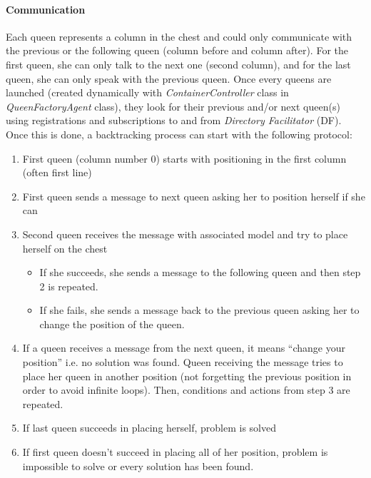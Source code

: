 \documentclass[a4paper,11pt]{article}
\begin{document}
  \paragraph{Communication}  
  Each queen represents a column in the chest and could only communicate with the previous or the following queen (column before and column after). 
  For the first queen, she can only talk to the next one (second column), and for the last queen, she can only speak with the previous queen. Once every 
  queens are launched (created dynamically with \textit{ContainerController} class in \textit{QueenFactoryAgent} class), they look for their previous 
  and/or next queen(s) using registrations and subscriptions to and from \textit{Directory Facilitator} (DF). Once this is done, a backtracking process 
  can start with the following protocol:
  \begin{enumerate}
   \item First queen (column number 0) starts with positioning in the first column (often first line)
   \item First queen sends a message to next queen asking her to position herself if she can
   \item Second queen receives the message with associated model and try to place herself on the chest
   \begin{itemize}
    \item If she succeeds, she sends a message to the following queen and then step 2 is repeated.
    \item If she fails, she sends a message back to the previous queen asking her to change the position of the queen.
   \end{itemize}
   \item If a queen receives a message from the next queen, it means ``change your position'' i.e. no solution was found.
   Queen receiving the message tries to place her queen in another position (not forgetting the previous position in order 
   to avoid infinite loops). Then, conditions and actions from step 3 are repeated.
   \item If last queen succeeds in placing herself, problem is solved
   \item If first queen doesn't succeed in placing all of her position, problem is impossible to solve or every solution has 
   been found.
  \end{enumerate}
  
\end{document}
